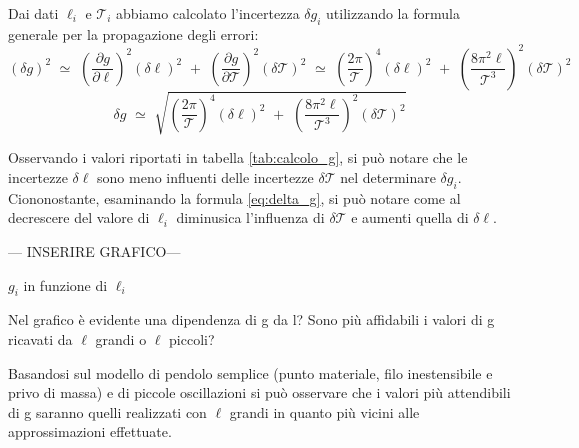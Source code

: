 Dai dati $\ell_i$ e $\mathcal{T}_i$ abbiamo calcolato l'incertezza $\delta g_i$ utilizzando la formula generale per la propagazione degli errori:
\begin{equation*}
(\delta g)^2 \,\, \simeq \,\, \left( \frac{\partial g}{\partial \ell} \right)^2 (\delta \ell)^2 \,\, + \,\, \left( \frac{\partial g}{\partial \mathcal{T}} \right)^2 (\delta \mathcal{T})^2 \,\, \simeq \,\, \left( \frac{2 \pi}{\mathcal{T}} \right)^4 (\delta \ell)^2 \,\, + \,\, \left( \frac{8 \pi^2 \ell}{\mathcal{T}^3} \right)^2 (\delta \mathcal{T})^2
\end{equation*}
\begin{equation} \label{eq:delta_g}
\delta g \,\, \simeq \,\, \sqrt{\left( \frac{2 \pi}{\mathcal{T}} \right)^4 (\delta \ell)^2 \,\, + \,\, \left( \frac{8 \pi^2 \ell}{\mathcal{T}^3} \right)^2 (\delta \mathcal{T})^2}
\end{equation}

Osservando i valori riportati in tabella \ref{tab:calcolo_g}, si può notare che le incertezze $\delta\ell$ sono meno influenti delle incertezze $\delta\mathcal{T}$ nel determinare $\delta g_i$. Ciononostante, esaminando la formula \ref{eq:delta_g}, si può notare come al decrescere del valore di $\ell_i$ diminusica l'influenza di $\delta\mathcal{T}$ e aumenti quella di $\delta\ell$.

\begin{center}
--- INSERIRE GRAFICO---

$g_i$ in funzione di $\ell_i$
\end{center}

Nel grafico è evidente una dipendenza di g da l? Sono più affidabili i valori di g ricavati da $\ell$ grandi o $\ell$ piccoli?

Basandosi sul modello di pendolo semplice (punto materiale, filo inestensibile e privo di massa) e di piccole oscillazioni si può osservare che i valori più attendibili di g saranno quelli realizzati con $\ell$ grandi in quanto più vicini alle approssimazioni effettuate.